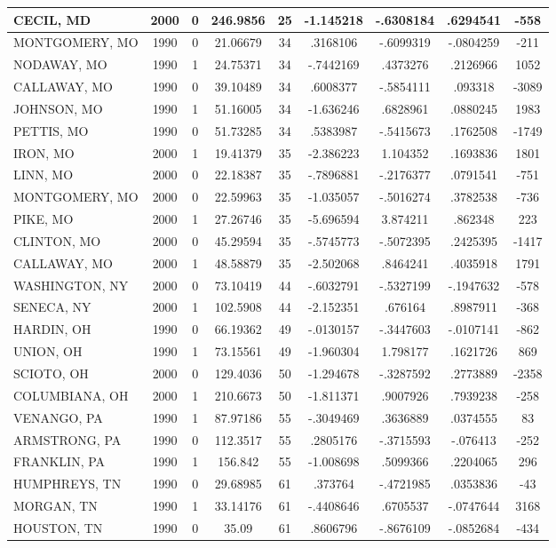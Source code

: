 \documentclass[a4paper,12pt]{article}
\begin{document}
\begin{landscape}
\begin{small}
\begin{center}
\begin{longtable}{lcccccccc}
CECIL, MD&2000&0&246.9856&25&-1.145218&-.6308184&.6294541&-558 \\ \hline
MONTGOMERY, MO&1990&0&21.06679&34&.3168106&-.6099319&-.0804259&-211 \\
NODAWAY, MO&1990&1&24.75371&34&-.7442169&.4373276&.2126966&1052 \\
CALLAWAY, MO&1990&0&39.10489&34&.6008377&-.5854111&.093318&-3089 \\
JOHNSON, MO&1990&1&51.16005&34&-1.636246&.6828961&.0880245&1983 \\
PETTIS, MO&1990&0&51.73285&34&.5383987&-.5415673&.1762508&-1749 \\ \hline
IRON, MO&2000&1&19.41379&35&-2.386223&1.104352&.1693836&1801 \\
LINN, MO&2000&0&22.18387&35&-.7896881&-.2176377&.0791541&-751 \\
MONTGOMERY, MO&2000&0&22.59963&35&-1.035057&-.5016274&.3782538&-736 \\
PIKE, MO&2000&1&27.26746&35&-5.696594&3.874211&.862348&223 \\
CLINTON, MO&2000&0&45.29594&35&-.5745773&-.5072395&.2425395&-1417 \\
CALLAWAY, MO&2000&1&48.58879&35&-2.502068&.8464241&.4035918&1791 \\ \hline
WASHINGTON, NY&2000&0&73.10419&44&-.6032791&-.5327199&-.1947632&-578 \\
SENECA, NY&2000&1&102.5908&44&-2.152351&.676164&.8987911&-368 \\ \hline
HARDIN, OH&1990&0&66.19362&49&-.0130157&-.3447603&-.0107141&-862 \\
UNION, OH&1990&1&73.15561&49&-1.960304&1.798177&.1621726&869 \\ \hline
SCIOTO, OH&2000&0&129.4036&50&-1.294678&-.3287592&.2773889&-2358 \\
COLUMBIANA, OH&2000&1&210.6673&50&-1.811371&.9007926&.7939238&-258 \\ \hline
VENANGO, PA&1990&1&87.97186&55&-.3049469&.3636889&.0374555&83 \\
ARMSTRONG, PA&1990&0&112.3517&55&.2805176&-.3715593&-.076413&-252 \\
FRANKLIN, PA&1990&1&156.842&55&-1.008698&.5099366&.2204065&296 \\  \hline
HUMPHREYS, TN&1990&0&29.68985&61&.373764&-.4721985&.0353836&-43 \\
MORGAN, TN&1990&1&33.14176&61&-.4408646&.6705537&-.0747644&3168 \\
HOUSTON, TN&1990&0&35.09&61&.8606796&-.8676109&-.0852684&-434 \\

\end{longtable}
\end{center}
\end{small}
\end{landscape}
\end{document}

